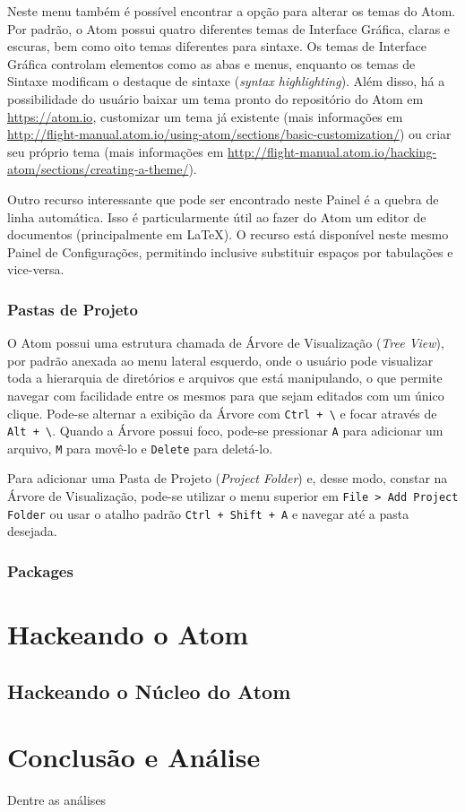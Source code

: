 	Neste menu também é possível encontrar a opção para alterar os temas do Atom. Por padrão, o Atom possui quatro diferentes temas de Interface Gráfica, claras e escuras, bem como oito temas diferentes para sintaxe. Os temas de Interface Gráfica controlam elementos como as abas e menus, enquanto os temas de Sintaxe modificam o destaque de sintaxe (\textit{syntax highlighting}). Além disso, há a possibilidade do usuário baixar um tema pronto do repositório do Atom em \href{https://atom.io}{https://atom.io}, customizar um tema já existente (mais informações em \href{http://flight-manual.atom.io/using-atom/sections/basic-customization/}{http://flight-manual.atom.io/using-atom/sections/basic-customization/}) ou criar seu próprio tema (mais informações em \href{http://flight-manual.atom.io/hacking-atom/sections/creating-a-theme/}{http://flight-manual.atom.io/hacking-atom/sections/creating-a-theme/}).

	Outro recurso interessante que pode ser encontrado neste Painel é a quebra de linha automática. Isso é particularmente útil ao fazer do Atom um editor de documentos (principalmente em \LaTeX). O recurso está disponível neste mesmo Painel de Configurações, permitindo inclusive substituir espaços por tabulações e vice-versa.

	\subsubsection{Pastas de Projeto}
	O Atom possui uma estrutura chamada de Árvore de Visualização (\textit{Tree View}), por padrão anexada ao menu lateral esquerdo, onde o usuário pode visualizar toda a hierarquia de diretórios e arquivos que está manipulando, o que permite navegar com facilidade entre os mesmos para que sejam editados com um único clique. Pode-se alternar a exibição da Árvore com \verb|Ctrl + \| e focar através de \verb|Alt + \|. Quando a Árvore possui foco, pode-se pressionar \verb|A| para adicionar um arquivo, \verb|M| para movê-lo e \verb|Delete| para deletá-lo.

	Para adicionar uma Pasta de Projeto (\textit{Project Folder}) e, desse modo, constar na Árvore de Visualização, pode-se utilizar o menu superior em \verb|File > Add Project Folder| ou usar o atalho padrão \verb|Ctrl + Shift + A| e navegar até a pasta desejada.

	\subsubsection{Packages}\label{sec:packages}


	\section{Hackeando o Atom}

	\subsection{Hackeando o Núcleo do Atom} \label{sec:hackingcore}


	\section{Conclusão e Análise}
	Dentre as análises

	
	


